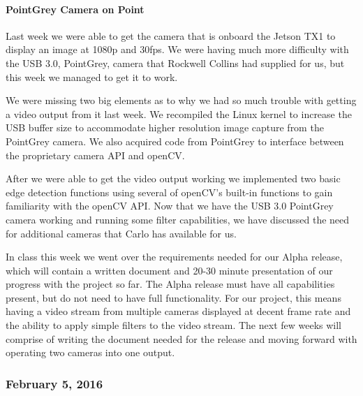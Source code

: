 \paragraph{PointGrey Camera on Point}
Last week we were able to get the camera that is onboard the Jetson TX1 to display an image at 1080p and 30fps. We were having much more difficulty with the USB 3.0, PointGrey, camera that Rockwell Collins had supplied for us, but this week we managed to get it to work.
\par
We were missing two big elements as to why we had so much trouble with getting a video output from it last week. We recompiled the Linux kernel to increase the USB buffer size to accommodate higher resolution image capture from the PointGrey camera. We also acquired code from PointGrey to interface between the proprietary camera API and openCV.
\par
After we were able to get the video output working we implemented two basic edge detection functions using several of openCV's built-in functions to gain familiarity with the openCV API. Now that we have the USB 3.0 PointGrey camera working and running some filter capabilities, we have discussed the need for additional cameras that Carlo has available for us. 
\par
In class this week we went over the requirements needed for our Alpha release, which will contain a written document and 20-30 minute presentation of our progress with the project so far. The Alpha release must have all capabilities present, but do not need to have full functionality. For our project, this means having a video stream from multiple cameras displayed at decent frame rate and the ability to apply simple filters to the video stream. The next few weeks will comprise of writing the document needed for the release and moving forward with operating two cameras into one output.\\

\subsubsection{February 5, 2016}
